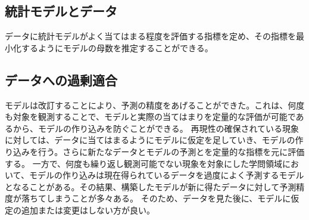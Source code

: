 \subsection{統計モデルとデータ}
データに統計モデルがよく当てはまる程度を評価する指標を定め、その指標を最小化するようにモデルの母数を推定することができる。



\subsection{データへの過剰適合}
モデルは改訂することにより、予測の精度をあげることができた。これは、何度も対象を観測することで、モデルと実際の当てはまりを定量的な評価が可能であるから、モデルの作り込みを防ぐことができる。
再現性の確保されている現象に対しては、データに当てはまるようにモデルに仮定を足していき、モデルの作り込みを行う。さらに新たなデータとモデルの予測とを定量的な指標を元に評価する。
一方で、何度も繰り返し観測可能でない現象を対象にした学問領域において、モデルの作り込みは現在得られているデータを過度によく予測するモデルとなることがある。その結果、構築したモデルが新に得たデータに対して予測精度が落ちてしまうことが多々ある。
そのため、データを見た後に、モデルに仮定の追加または変更はしない方が良い。




